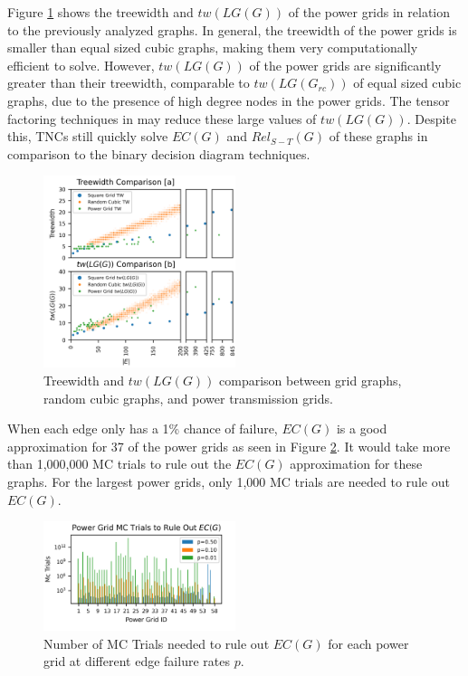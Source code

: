 \documentclass[12pt,twocolumn]{article}
\begin{document}
Figure \ref{fig:Width Comparison} shows the treewidth and \(tw(LG(G))\) of the power grids in relation to the previously analyzed graphs. In general, the treewidth of the power grids is smaller than equal sized cubic graphs, making them very computationally efficient to solve. However, \(tw(LG(G))\) of the power grids are significantly greater than their treewidth, comparable to \(tw(LG(G_{rc}))\) of equal sized cubic graphs, due to the presence of high degree nodes in the power grids. The tensor factoring techniques in \cite{dudek2019efficient} may reduce these large values of \(tw(LG(G))\). Despite this, TNCs still quickly solve \(EC(G)\) and \(Rel_{S-T}(G)\) of these graphs in comparison to the binary decision diagram techniques.

\begin{figure}[t]
\caption{Treewidth and $tw(LG(G))$ comparison between grid graphs, random cubic graphs, and power transmission grids.}
\label{fig:Width Comparison}
\includegraphics[width=0.5\textwidth]{../figures/WidthCompare.png}
\end{figure}

When each edge only has a 1\% chance of failure, \(EC(G)\) is a good approximation for 37 of the power grids as seen in Figure \ref{fig:Power Grid MC}. It would take more than 1,000,000 MC trials to rule out the \(EC(G)\) approximation for these graphs. For the largest power grids, only 1,000 MC trials are needed to rule out \(EC(G)\).

\begin{figure}[t]
\caption{Number of MC Trials needed to rule out $EC(G)$ for each power grid at different edge failure rates $p$.}
\label{fig:Power Grid MC}
\includegraphics[width=0.5\textwidth]{../figures/PowerGridMC.png}
\end{figure}
\end{document}
